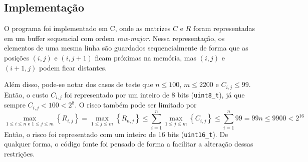\subsection{Implementação}

O programa foi implementado em C, onde as matrizes $C$ e $R$ foram representadas em um buffer sequencial com ordem \textit{row-major}. Nessa representação, os elementos de uma mesma linha são guardados sequencialmente de forma que as posições $(i, j)$ e $(i, j + 1)$ ficam próximas na memória, mas $(i, j)$ e $(i + 1, j)$ podem ficar distantes.

Além disso, pode-se notar dos casos de teste que $n \leq 100$, $m \leq 2200$ e $C_{i, j} \leq 99$. Então, o custo $C_{i, j}$ foi representado por um inteiro de 8 bits (\texttt{uint8\_t}), já que sempre $C_{i, j} < 100 < 2^8$. O risco também pode ser limitado por
\[
    \max_{1 \leq i \leq n \text{~e~} 1 \leq j \leq m} \left\{R_{i, j}\right\} = \max_{1 \leq j \leq m} \left\{R_{n, j}\right\} \leq \sum_{i = 1}^n \max_{1 \leq j \leq m}\left\{C_{i, j}\right\} \leq \sum_{i = 1}^n 99 = 99 n \leq 9900 < 2^{16}
\]
Então, o risco foi representado com um inteiro de 16 bits (\texttt{uint16\_t}). De qualquer forma, o código fonte foi pensado de forma a facilitar a alteração dessas restrições.
